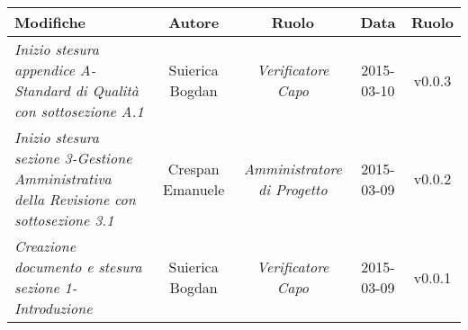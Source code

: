 \newpage

\begin{table}[h]
\centering
\begin{tabular}{|p{}|c|c|c|c|}
	\toprule
		\textbf{Modifiche} & \textbf{Autore} & \textbf{Ruolo} & \textbf{Data} & \textbf{Ruolo} \\
	\midrule
	\midrule
		\textit{Inizio stesura appendice A-Standard di Qualità con sottosezione A.1} & Suierica Bogdan & \textit{Verificatore Capo} & 2015-03-10 & v0.0.3 \\
	\midrule
		\textit{Inizio stesura sezione 3-Gestione Amministrativa della Revisione con sottosezione 3.1} & Crespan Emanuele & \textit{Amministratore di Progetto} & 2015-03-09 & v0.0.2 \\	                         
	\midrule
		\textit{Creazione documento e stesura sezione 1-Introduzione} & Suierica Bogdan & \textit{Verificatore Capo} & 2015-03-09 & v0.0.1 \\
	\bottomrule
\end{tabular}	
\end{table}

\newpage